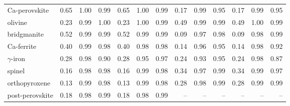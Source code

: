 \begin{table}[!htbp]
\begin{tabular}{@{}l|rrr|rrr|rrr|rrr@{}}
Ca-perovskite & 0.65 & \cellcolor[RGB]{255,253,253}1.00 & \cellcolor[RGB]{254,251,251}0.99 & 0.65 & \cellcolor[RGB]{255,253,253}1.00 & \cellcolor[RGB]{254,251,251}0.99 & 0.17 & \cellcolor[RGB]{254,250,250}0.99 & \cellcolor[RGB]{249,221,219}0.95 & 0.17 & \cellcolor[RGB]{254,250,249}0.99 & \cellcolor[RGB]{249,222,221}0.95 \\
olivine & 0.23 & \cellcolor[RGB]{254,250,250}0.99 & \cellcolor[RGB]{254,252,252}1.00 & 0.23 & \cellcolor[RGB]{254,252,252}1.00 & \cellcolor[RGB]{254,250,250}0.99 & 0.49 & \cellcolor[RGB]{254,251,251}0.99 & \cellcolor[RGB]{254,249,249}0.99 & 0.49 & \cellcolor[RGB]{255,252,252}1.00 & \cellcolor[RGB]{254,249,248}0.99 \\
bridgmanite & 0.52 & \cellcolor[RGB]{254,249,249}0.99 & \cellcolor[RGB]{254,251,251}0.99 & 0.52 & \cellcolor[RGB]{254,249,248}0.99 & \cellcolor[RGB]{254,251,251}0.99 & 0.09 & \cellcolor[RGB]{252,236,235}0.97 & \cellcolor[RGB]{253,243,242}0.98 & 0.09 & \cellcolor[RGB]{253,243,242}0.98 & \cellcolor[RGB]{254,246,246}0.99 \\
Ca-ferrite & 0.40 & \cellcolor[RGB]{253,245,244}0.99 & \cellcolor[RGB]{252,240,239}0.98 & 0.40 & \cellcolor[RGB]{253,244,243}0.98 & \cellcolor[RGB]{253,244,243}0.98 & 0.14 & \cellcolor[RGB]{250,226,224}0.96 & \cellcolor[RGB]{250,223,221}0.95 & 0.14 & \cellcolor[RGB]{253,242,241}0.98 & \cellcolor[RGB]{246,201,198}0.92 \\
$\gamma$-iron & 0.28 & \cellcolor[RGB]{253,242,241}0.98 & \cellcolor[RGB]{244,190,186}0.90 & 0.28 & \cellcolor[RGB]{249,221,219}0.95 & \cellcolor[RGB]{252,236,235}0.97 & 0.24 & \cellcolor[RGB]{247,206,203}0.93 & \cellcolor[RGB]{249,222,220}0.95 & 0.24 & \cellcolor[RGB]{253,241,240}0.98 & \cellcolor[RGB]{240,165,160}0.87 \\
spinel & 0.16 & \cellcolor[RGB]{253,243,242}0.98 & \cellcolor[RGB]{253,244,244}0.98 & 0.16 & \cellcolor[RGB]{253,245,245}0.99 & \cellcolor[RGB]{253,243,243}0.98 & 0.34 & \cellcolor[RGB]{252,235,234}0.97 & \cellcolor[RGB]{254,248,248}0.99 & 0.34 & \cellcolor[RGB]{254,246,246}0.99 & \cellcolor[RGB]{251,234,232}0.97 \\
orthopyroxene & 0.13 & \cellcolor[RGB]{253,246,246}0.99 & \cellcolor[RGB]{252,238,237}0.98 & 0.13 & \cellcolor[RGB]{254,249,248}0.99 & \cellcolor[RGB]{253,241,240}0.98 & 0.28 & \cellcolor[RGB]{253,242,241}0.98 & \cellcolor[RGB]{254,249,249}0.99 & 0.28 & \cellcolor[RGB]{253,245,244}0.99 & \cellcolor[RGB]{254,248,247}0.99 \\
post-perovskite & 0.18 & \cellcolor[RGB]{253,245,244}0.98 & \cellcolor[RGB]{254,247,246}0.99 & 0.18 & \cellcolor[RGB]{253,241,240}0.98 & \cellcolor[RGB]{254,248,248}0.99 & -- & -- & -- & -- & -- & -- \\

\end{tabular}
\end{table}
